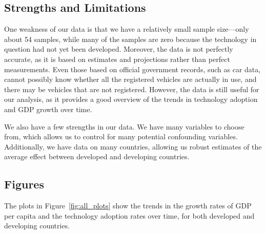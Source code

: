 \documentclass[11pt]{texMemo}
\begin{document}
\subsection{Strengths and Limitations}
One weakness of our data is that we have a relatively small sample size—only about 54 samples, while many of the samples are zero because the technology in question had not yet been developed.
Moreover, the data is not perfectly accurate, as it is based on estimates and projections rather than perfect measurements.
Even those based on official government records, such as car data, cannot possibly know whether all the registered vehicles are actually in use, and there may be vehicles that are not registered.
However, the data is still useful for our analysis, as it provides a good overview of the trends in technology adoption and GDP growth over time.

We also have a few strengths in our data.
We have many variables to choose from, which allows us to control for many potential confounding variables.
Additionally, we have data on many countries, allowing us robust estimates of the average effect between developed and developing countries.


\subsection{Figures}
The plots in Figure~\ref{fig:all_plots} show the trends in the growth rates of GDP per capita and the technology adoption rates over time, for both developed and developing countries.
\end{document}
